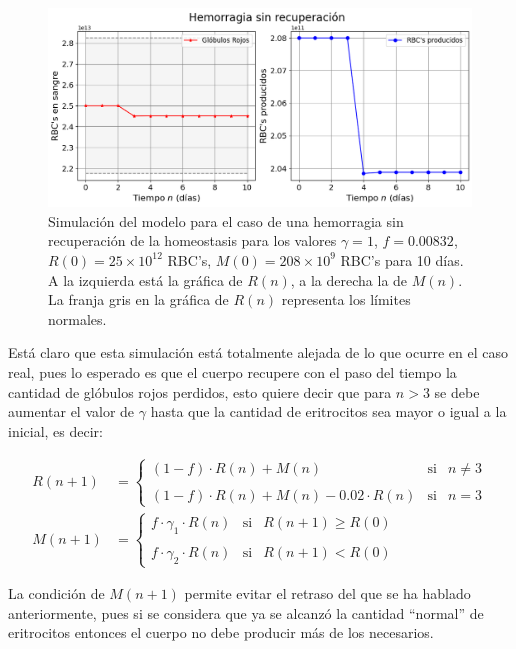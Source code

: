 \begin{figure}[H]
    \centering
    \captionsetup{justification=centering}
    \includegraphics[scale=0.534]{figures/HemoLeveG1.png}
    \caption{Simulación del modelo para el caso de una hemorragia sin recuperación de la homeostasis para los valores $\gamma = 1$, $f = 0.00832$, $R(0)=25\times 10^{12}$ RBC's, $M(0) = 208\times 10^{9}$ RBC's para 10 días. A la izquierda está la gráfica de $R(n)$, a la derecha la de $M(n)$. La franja gris en la gráfica de $R(n)$ representa los límites normales.}
    \label{sec:variaciones:fig:HemoLeveG1}
\end{figure}

Está claro que esta simulación está totalmente alejada de lo que ocurre en el caso real, pues lo esperado es que el cuerpo recupere con el paso del tiempo la cantidad de glóbulos rojos perdidos, esto quiere decir que para $n>3$ se debe aumentar el valor de $\gamma$ hasta que la cantidad de eritrocitos sea mayor o igual a la inicial, es decir:

\begin{align}\label{eq:HemoLeveBien}
    R(n+1) &= \left\{ \begin{array}{lcc} (1-f)\cdot R(n)+M(n) & \textrm{si} & n \neq 3 \\ \\ (1-f)\cdot R(n)+M(n)-0.02\cdot R(n) & \textrm{si} & n = 3\end{array} \right. \\
    M(n+1) &=\left\{ \begin{array}{lcc} f\cdot \gamma_1 \cdot R(n) & \textrm{si} & R(n+1) \geq R(0) \\ \\ f\cdot \gamma_2\cdot R(n) & \textrm{si} & R(n+1)<R(0)\end{array} \right. \nonumber
\end{align}

La condición de $M(n+1)$ permite evitar el retraso del que se ha hablado anteriormente, pues si se considera que ya se alcanzó la cantidad ``normal'' de eritrocitos entonces el cuerpo no debe producir más de los necesarios.

